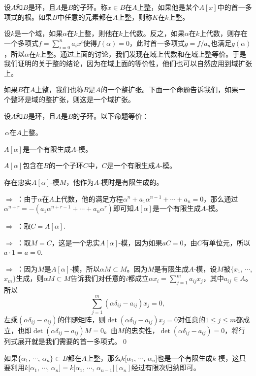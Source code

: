 \para 设$A$和$B$是环，且$A$是$B$的子环。称$x\in B$在$A$上整，如果他是某个$A[x]$中的首一多项式的根。如果$B$中任意的元素都在$A$上整，则称$K$在$k$上整。

设$k$是一个域，如果$\alpha$在$k$上整，则他在$k$上代数。反之，如果$\alpha$在$k$上代数，则存在一个多项式$f=\sum_{i=0}^na_ix^i$使得$f(\alpha)=0$，此时首一多项式$g=f/a_n$也满足$g(\alpha)$，所以$\alpha$在$k$上整。通过上面的讨论，我们发现在域上代数和在域上整等价。于是我们证明的关于整的结论，因为在域上面的等价性，他们也可以自然应用到域扩张上。

如果$B$在$A$上整，我们也称$B$是$A$的一个整扩张。下面一个命题告诉我们，如果一个整环是域的整扩张，则这是一个域扩张。

\pro 设$A$和$B$是环，且$A$是$B$的子环。以下命题等价：

	 $\,\alpha$在$A$上整。

	 $A[\alpha]$是一个有限生成$A$-模。

	 $A[\alpha]$包含在$B$的一个子环$C$中，$C$是一个有限生成$A$-模。

	 存在忠实$A[\alpha]$-模$M$，他作为$A$-模时是有限生成的。
	\label{p2:1}

\proof {} $\Rightarrow$  ：由于$\alpha$在$A$上代数，他的满足方程$\alpha^n+a_1\alpha^{n-1}+\cdots+a_n=0$，那么通过$\alpha^{n+r}=-(a_1\alpha^{n+r-1}+\cdots+a_n\alpha^r)$即可知$A[\alpha]$是一个有限生成$A$-模。

	 $\Rightarrow$  ：取$C=A[\alpha]$.

	 $\Rightarrow$  ：取$M=C$，这是一个忠实$A[\alpha]$-模，因为如果$aC=0$，由$C$有单位元，所以$a\cdot 1=a=0$.

	 $\Rightarrow$  ：因为$M$是$A[\alpha]$-模，所以$\alpha M\subset M$。因为$M$是有限生成$A$-模，设$M$被$\{x_1$, $\cdots$, $x_m\}$生成，则$\alpha M\subset M$告诉我们对任意的$i$都成立$\alpha x_i=\sum_{j=1}^m a_{ij} x_j$，其中$a_{ij}\in A$。所以
	\[
		\sum_{j=1}^m (\alpha\delta_{ij} -a_{ij})x_j=0,
	\]
	左乘$(\alpha\delta_{ij} -a_{ij})$的伴随矩阵，则$\det(\alpha\delta_{ij} -a_{ij})x_j=0$对任意的$1\leq j \leq m$都成立，也即$\det(\alpha\delta_{ij} -a_{ij})M=0$。由$M$的忠实性，$\det(\alpha\delta_{ij} -a_{ij})=0$，将行列式展开就是我们需要的首一多项式。\qed

如果$\{\alpha_1$, $\cdots$, $\alpha_n\}\subset B$都在$A$上整，那么$k[\alpha_1$, $\cdots$, $\alpha_n]$也是一个有限生成$k$-模，这只要利用$k[\alpha_1$, $\cdots$, $\alpha_n]=k[\alpha_1$, $\cdots$, $\alpha_{n-1}][\alpha_n]$经过有限次归纳即可。

